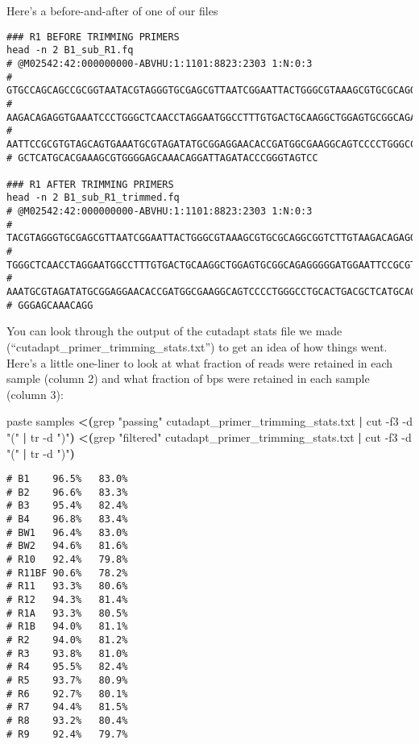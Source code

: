 \documentclass[
]{book}
\newenvironment{Shaded}{\begin{snugshade}}{\end{snugshade}}
\newcommand{\AttributeTok}[1]{\textcolor[rgb]{0.77,0.63,0.00}{#1}}
\newcommand{\ExtensionTok}[1]{#1}
\newcommand{\FunctionTok}[1]{\textcolor[rgb]{0.00,0.00,0.00}{#1}}
\newcommand{\KeywordTok}[1]{\textcolor[rgb]{0.13,0.29,0.53}{\textbf{#1}}}
\newcommand{\NormalTok}[1]{#1}
\newcommand{\OperatorTok}[1]{\textcolor[rgb]{0.81,0.36,0.00}{\textbf{#1}}}
\newcommand{\StringTok}[1]{\textcolor[rgb]{0.31,0.60,0.02}{#1}}
\begin{document}
Here's a before-and-after of one of our files

\begin{verbatim}
### R1 BEFORE TRIMMING PRIMERS
head -n 2 B1_sub_R1.fq
# @M02542:42:000000000-ABVHU:1:1101:8823:2303 1:N:0:3
# GTGCCAGCAGCCGCGGTAATACGTAGGGTGCGAGCGTTAATCGGAATTACTGGGCGTAAAGCGTGCGCAGGCGGTCTTGT
# AAGACAGAGGTGAAATCCCTGGGCTCAACCTAGGAATGGCCTTTGTGACTGCAAGGCTGGAGTGCGGCAGAGGGGGATGG
# AATTCCGCGTGTAGCAGTGAAATGCGTAGATATGCGGAGGAACACCGATGGCGAAGGCAGTCCCCTGGGCCTGCACTGAC
# GCTCATGCACGAAAGCGTGGGGAGCAAACAGGATTAGATACCCGGGTAGTCC

### R1 AFTER TRIMMING PRIMERS
head -n 2 B1_sub_R1_trimmed.fq
# @M02542:42:000000000-ABVHU:1:1101:8823:2303 1:N:0:3
# TACGTAGGGTGCGAGCGTTAATCGGAATTACTGGGCGTAAAGCGTGCGCAGGCGGTCTTGTAAGACAGAGGTGAAATCCC
# TGGGCTCAACCTAGGAATGGCCTTTGTGACTGCAAGGCTGGAGTGCGGCAGAGGGGGATGGAATTCCGCGTGTAGCAGTG
# AAATGCGTAGATATGCGGAGGAACACCGATGGCGAAGGCAGTCCCCTGGGCCTGCACTGACGCTCATGCACGAAAGCGTG
# GGGAGCAAACAGG
\end{verbatim}

You can look through the output of the cutadapt stats file we made (``cutadapt\_primer\_trimming\_stats.txt'') to get an idea of how things went. Here's a little one-liner to look at what fraction of reads were retained in each sample (column 2) and what fraction of bps were retained in each sample (column 3):

\begin{Shaded}
\begin{Highlighting}[]
    \ExtensionTok{paste}\NormalTok{ samples }\OperatorTok{\textless{}(}\FunctionTok{grep} \StringTok{"passing"}\NormalTok{ cutadapt\_primer\_trimming\_stats.txt }\KeywordTok{|} \FunctionTok{cut} \AttributeTok{{-}f3} \AttributeTok{{-}d} \StringTok{"("} \KeywordTok{|} \FunctionTok{tr} \AttributeTok{{-}d} \StringTok{")"}\OperatorTok{)} \OperatorTok{\textless{}(}\FunctionTok{grep} \StringTok{"filtered"}\NormalTok{ cutadapt\_primer\_trimming\_stats.txt }\KeywordTok{|} \FunctionTok{cut} \AttributeTok{{-}f3} \AttributeTok{{-}d} \StringTok{"("} \KeywordTok{|} \FunctionTok{tr} \AttributeTok{{-}d} \StringTok{")"}\OperatorTok{)}
\end{Highlighting}
\end{Shaded}

\begin{verbatim}
# B1    96.5%   83.0%
# B2    96.6%   83.3%
# B3    95.4%   82.4%
# B4    96.8%   83.4%
# BW1   96.4%   83.0%
# BW2   94.6%   81.6%
# R10   92.4%   79.8%
# R11BF 90.6%   78.2%
# R11   93.3%   80.6%
# R12   94.3%   81.4%
# R1A   93.3%   80.5%
# R1B   94.0%   81.1%
# R2    94.0%   81.2%
# R3    93.8%   81.0%
# R4    95.5%   82.4%
# R5    93.7%   80.9%
# R6    92.7%   80.1%
# R7    94.4%   81.5%
# R8    93.2%   80.4%
# R9    92.4%   79.7%
\end{verbatim}
\end{document}
